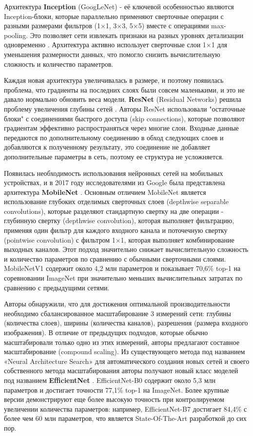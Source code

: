 \documentclass[14pt]{extarticle}
\begin{document}
Архитектура \textbf{Inception} (GoogLeNet) - её ключевой особенностью являются Inception-блоки, которые параллельно применяют сверточные операции с разными размерами фильтров (1×1, 3×3, 5×5) вместе с операциями max-pooling. Это позволяет сети извлекать признаки на разных уровнях детализации одновременно \cite{szegedy2014going}. Архитектура активно использует сверточные слои 1×1 для уменьшения размерности данных, что помогло снизить вычислительную сложность и количество параметров.

Каждая новая архитектура увеличивалась в размере, и поэтому появилась проблема, что градиенты на последних слоях были совсем маленькими, и это не давало нормально обновить веса модели. \textbf{ResNet} (Residual Networks) решила проблему увеличения глубины сетей \cite{he2015deep}. Авторы ResNet использовали "остаточные блоки" с соединениями быстрого доступа (skip connections), которые позволяют градиентам эффективно распространяться через многие слои. Входные данные передаются по дополнительному соединению в обход следующих слоев и добавляются к полученному результату, это соединение не добавляет дополнительные параметры в сеть, поэтому ее структура не усложняется.

Появилась необходимость использования нейронных сетей на мобильных устройствах, и в 2017 году исследователями из Google была представлена архитектура  \textbf{MobileNet} \cite{howard2017mobilenets}. Основным отличием  MobileNet является использование глубоких отделимых сверточных слоев (depthwise separable convolutions), которые разделяют стандартную свертку на две операции - глубинную свертку (depthwise convolution), которая выполняет фильтрацию, применяя один фильтр для каждого входного канала и поточечную свертку (pointwise convolution) с фильтром 1×1, которая выполняет комбинирование выходных каналов. Этот подход значительно снижает вычислительную сложность и количество параметров по сравнению с обычными сверточными слоями. MobileNetV1 содержит около 4,2 млн параметров и показывает 70,6\% top-1 на соревновании ImageNet при значительно меньших вычислительных затратах по сравнению с предыдущими сетями.

Авторы обнаружили, что для достижения оптимальной производительности необходимо сбалансированное масштабирование 3 измерений сети: глубины (количества слоев), ширины (количества каналов), разрешения (размера входного изображения). В отличие от предыдущих подходов, которые обычно масштабировали только одно из этих измерений, авторы предлагают составное масштабирование (compound scaling). Из существующего метода под названием «Neural Architecture Search» \cite{zoph2017neural} для автоматического создания новых сетей и своего собственного метода масштабирования авторы получают новый класс моделей под названием  \textbf{EfficientNet} \cite{tan2019efficientnet}. EfficientNet-B0 содержит около 5,3 млн параметров и достигает точности 77,1\% top-1 на ImageNet. Более крупные версии демонстрируют еще более высокую точность при контролируемом увеличении количества параметров: например, EfficientNet-B7 достигает 84,4\% с более чем 60 млн параметров, что является State-Of-The-Art разработкой до сих пор. 
\end{document}
